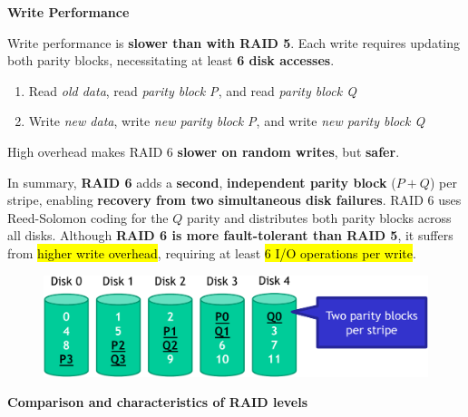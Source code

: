 \highspace
\begin{flushleft}
    \textcolor{Red2}{ \textbf{Write Performance}}
\end{flushleft}
Write performance is \textbf{slower than with RAID 5}. Each write requires updating both parity blocks, necessitating at least \textbf{6 disk accesses}.
\begin{enumerate}
    \item Read \emph{old data}, read \emph{parity block P}, and read \emph{parity block Q}
    \item Write \emph{new data}, write \emph{new parity block P}, and write \emph{new parity block Q}
\end{enumerate}
High overhead makes RAID 6 \textcolor{Red2}{\textbf{slower on random writes}}, but \textcolor{Green3}{\textbf{safer}}.

\highspace
In summary, \textbf{RAID 6} adds a \textbf{second}, \textbf{independent parity block} ($P + Q$) per stripe, enabling \textbf{recovery from two simultaneous disk failures}. RAID 6 uses Reed-Solomon coding for the $Q$ parity and distributes both parity blocks across all disks. Although \textbf{RAID 6 is more fault-tolerant than RAID 5}, it suffers from \hl{higher write overhead}, requiring at least \hl{6 I/O operations per write}.

\newpage

\begin{figure}[!htp]
    \centering
    \includegraphics[width=\textwidth]{img/raid-010.pdf}
\end{figure}

\longline

\begin{center}\label{Comparison and characteristics of RAID levels}
    \large
    \hypertarget{Comparison and characteristics of RAID levels}{\textcolor{Red2}{\textbf{Comparison and characteristics of RAID levels}}}
\end{center}

